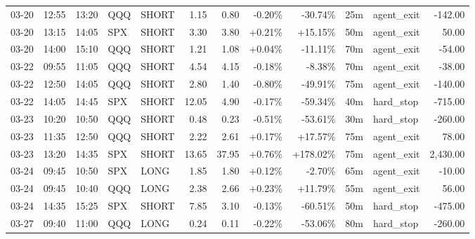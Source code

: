 \documentclass[11pt,a4paper,twoside]{article}
\begin{document}
\begin{center}
\begin{longtable}{>{\color{txtmain}}l l l l l r r r r r >{\color{txtmain}}l r}
03-20 & 12:55 & 13:20 & QQQ & SHORT & 1.15 & 0.80 & \textcolor{lossred}{-0.20\%} & \textcolor{lossred}{-30.74\%} & 25m & agent\_exit & \textcolor{lossred}{-142.00} \\
03-20 & 13:15 & 14:05 & SPX & SHORT & 3.30 & 3.80 & \textcolor{wingreen}{+0.21\%} & \textcolor{wingreen}{+15.15\%} & 50m & agent\_exit & \textcolor{wingreen}{50.00} \\
03-20 & 14:00 & 15:10 & QQQ & SHORT & 1.21 & 1.08 & \textcolor{wingreen}{+0.04\%} & \textcolor{lossred}{-11.11\%} & 70m & agent\_exit & \textcolor{lossred}{-54.00} \\
03-22 & 09:55 & 11:05 & QQQ & SHORT & 4.54 & 4.15 & \textcolor{lossred}{-0.18\%} & \textcolor{lossred}{-8.38\%} & 70m & agent\_exit & \textcolor{lossred}{-38.00} \\
03-22 & 12:50 & 14:05 & QQQ & SHORT & 2.80 & 1.40 & \textcolor{lossred}{-0.80\%} & \textcolor{lossred}{-49.91\%} & 75m & agent\_exit & \textcolor{lossred}{-140.00} \\
03-22 & 14:05 & 14:45 & SPX & SHORT & 12.05 & 4.90 & \textcolor{lossred}{-0.17\%} & \textcolor{lossred}{-59.34\%} & 40m & hard\_stop & \textcolor{lossred}{-715.00} \\
03-23 & 10:20 & 10:50 & QQQ & SHORT & 0.48 & 0.23 & \textcolor{lossred}{-0.51\%} & \textcolor{lossred}{-53.61\%} & 30m & hard\_stop & \textcolor{lossred}{-260.00} \\
03-23 & 11:35 & 12:50 & QQQ & SHORT & 2.22 & 2.61 & \textcolor{wingreen}{+0.17\%} & \textcolor{wingreen}{+17.57\%} & 75m & agent\_exit & \textcolor{wingreen}{78.00} \\
03-23 & 13:20 & 14:35 & SPX & SHORT & 13.65 & 37.95 & \textcolor{wingreen}{+0.76\%} & \textcolor{wingreen}{+178.02\%} & 75m & agent\_exit & \textcolor{wingreen}{2,430.00} \\
03-24 & 09:45 & 10:50 & SPX & LONG & 1.85 & 1.80 & \textcolor{wingreen}{+0.12\%} & \textcolor{lossred}{-2.70\%} & 65m & agent\_exit & \textcolor{lossred}{-10.00} \\
03-24 & 09:45 & 10:40 & QQQ & LONG & 2.38 & 2.66 & \textcolor{wingreen}{+0.23\%} & \textcolor{wingreen}{+11.79\%} & 55m & agent\_exit & \textcolor{wingreen}{56.00} \\
03-24 & 14:35 & 15:25 & SPX & SHORT & 7.85 & 3.10 & \textcolor{lossred}{-0.13\%} & \textcolor{lossred}{-60.51\%} & 50m & hard\_stop & \textcolor{lossred}{-475.00} \\
03-27 & 09:40 & 11:00 & QQQ & LONG & 0.24 & 0.11 & \textcolor{lossred}{-0.22\%} & \textcolor{lossred}{-53.06\%} & 80m & hard\_stop & \textcolor{lossred}{-260.00} \\

\end{longtable}
\end{center}
\end{document}

